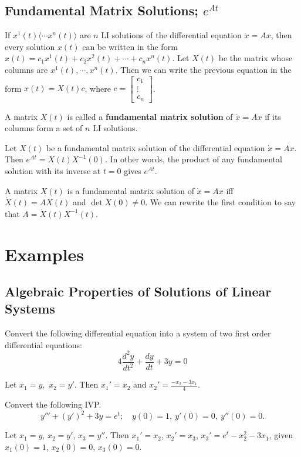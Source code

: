 \subsection{Fundamental Matrix Solutions; $e^{At}$}
If $x^1(t)\langle \cdots x^n (t) \rangle $ are $n$ LI solutions of the differential equation $\dot x=Ax$, then every solution $x(t)$ can be written in the form $x(t)=c_1x^1(t)+c_2x^2(t)+\cdots +c_n x^n (t)$. Let $X(t)$ be the matrix whose columns are $x^1(t),\cdots ,x^n (t)$. Then we can write the previous equation in the form $x(t)=X(t)c$, where $c=
\begin{bmatrix}
    c_1\\ \vdots \\ c_n 
\end{bmatrix}$.
\begin{definition}
    A matrix $X(t)$ is called a \textbf{fundamental matrix solution} of $\dot x=Ax$ if its columns form a set of $n$ LI solutions.
\end{definition}
\begin{theorem}
    Let $X(t)$ be a fundamental matrix solution of the differential equation $\dot x=Ax$. Then $e^{At}=X(t)X^{-1}(0)$. In other words, the product of any fundamental solution with its inverse at $t=0$ gives $e^{At}$.
\end{theorem}
\begin{lemma}
    A matrix $X(t)$ is a fundamental matrix solution of $\dot x=Ax$ iff $\dot X(t)=AX(t)$ and $\det X(0)\neq 0$. We can rewrite the first condition to say that $A=\dot X(t)X^{-1}(t)$.
\end{lemma}

\newpage
\section{Examples}

\subsection{Algebraic Properties of Solutions of Linear Systems}
\begin{prob}
    Convert the following differential equation into a system of two first order differential equations: \[
    4 \frac{d^2y}{dt^2}+\frac{dy}{dt}+3y=0
    \] 
\end{prob}
\begin{solution}
    Let $x_1=y,$ $x_2=y'$. Then $x_1'=x_2$ and $x_2'=\frac{-x_2-3x_1}{4}$.
\end{solution}
\begin{prob}
    Convert the following IVP.
    \[
        y'''+(y')^2+3y=e^t; \quad y(0)=1, \ y'(0)=0, \ y''(0)=0.
    \] 
\end{prob}
\begin{solution}
    Let $x_1=y$, $x_2=y'$, $x_3=y''$. Then $x_1'=x_2$, $x_2'=x_3$, $x_3'=e^t-x_2^2-3x_1$, given $x_1(0)=1$, $x_2(0)=0$, $x_3(0)=0$.
\end{solution}

